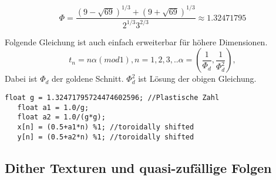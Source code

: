 \begin{equation} \label{eq:plastische Nummer}
   \Phi = \frac{(9 - \sqrt{69})^{1/3} + (9 + \sqrt{69})^{1/3}}
               {2^{1/3}3^{2/3}} \approx 1.32471795
\end{equation}

\cite{vanderlaanplasticnumber}
\cite{wolframalphaPlastic}
Folgende Gleichung ist auch einfach erweiterbar für höhere Dimensionen.
\begin{equation}\label{eq:1 zu N - Dimensional}
    t_{n} = n\alpha(mod 1), n = 1,2,3,..
    \alpha = (\frac{1}{\Phi_{d}}, \frac{1}{\Phi_{d}^{2}}),
\end{equation}
Dabei ist $\Phi_{d}$ der goldene Schnitt. $\Phi_{d}^{2}$ ist Lösung der
 obigen Gleichung.


\cite{quasirandomsequencesbyRoberts}
\begin{lstlisting}[style=CStyle]
   float g = 1.32471795724474602596; //Plastische Zahl
   float a1 = 1.0/g;
   float a2 = 1.0/(g*g);
   x[n] = (0.5+a1*n) %1; //toroidally shifted
   y[n] = (0.5+a2*n) %1; //toroidally shifted
\end{lstlisting}


\subsection{Dither Texturen und quasi-zufällige Folgen}
